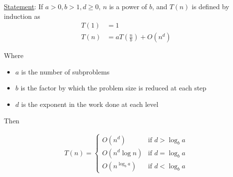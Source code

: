 \documentclass[10pt]{extarticle}
\begin{document}
\underline{Statement}: If $a > 0, b > 1, d \ge 0$, $n$ is a power of $b$, and
$T(n)$ is defined by induction as
\begin{align*}
    T(1) & = 1                                   \\
    T(n) & = aT\left(\frac{n}{b}\right) + O(n^d)
\end{align*}

Where
\begin{itemize}
    \item $a$ is the number of subproblems
    \item $b$ is the factor by which the problem size is reduced at each step
    \item $d$ is the exponent in the work done at each level
\end{itemize}

Then

\begin{align*}
    T(n) = \begin{cases}
               O(n^d)          & \text{if } d > \log_b a \\
               O(n^d \log n)   & \text{if } d = \log_b a \\
               O(n^{\log_b a}) & \text{if } d < \log_b a
           \end{cases}
\end{align*}
\end{document}
